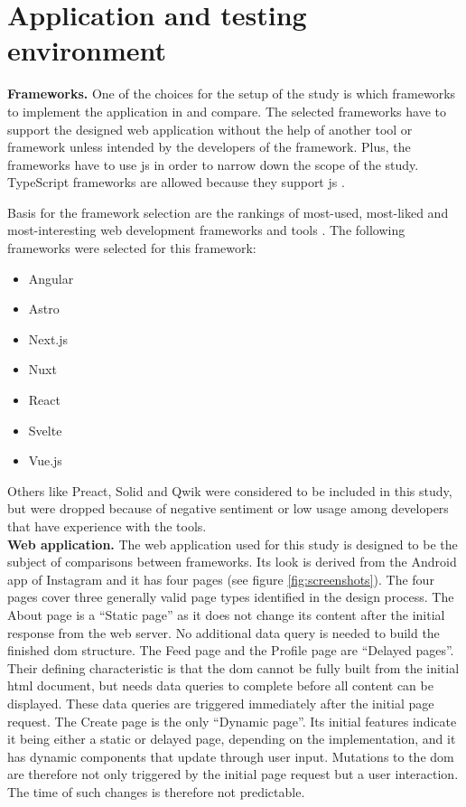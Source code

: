 \documentclass[a4paper, 12pt]{article}
\begin{document}
\section{Application and testing environment}

\textbf{Frameworks.} One of the choices for the setup of the study is which frameworks to implement the application in and compare.
The selected frameworks have to support the designed web application without the help of another tool or framework unless intended by the developers of the framework.
Plus, the frameworks have to use \acrfull{js}  in order to narrow down the scope of the study.
TypeScript frameworks are allowed because they support \acrshort{js} \citep{typescript}.

Basis for the framework selection are the rankings of most-used, most-liked and most-interesting web development frameworks and tools \citep{stateOfJs2023}.
The following frameworks were selected for this framework:

\begin{multicols}{4}
\begin{itemize}
  \item Angular
  \item Astro
  \item Next.js
  \item Nuxt
  \item React
  \item Svelte
  \item Vue.js
\end{itemize}
\end{multicols}

Others like Preact, Solid and Qwik were considered to be included in this study, but were dropped because of negative sentiment or low usage among developers that have experience with the tools.
\\

\textbf{Web application.} The web application used for this study is designed to be the subject of comparisons between frameworks.
Its look is derived from the Android app of Instagram \citep{instagram} and it has four pages (see figure \ref{fig:screenshots}).
The four pages cover three generally valid page types identified in the design process.
The About page is a \enquote{Static page} as it does not change its content after the initial response from the web server.
No additional data query is needed to build the finished \acrshort{dom} structure.
The Feed page and the Profile page are \enquote{Delayed pages}.
Their defining characteristic is that the \acrshort{dom} cannot be fully built from the initial \acrshort{html} document, but needs data queries to complete before all content can be displayed.
These data queries are triggered immediately after the initial page request.
The Create page is the only \enquote{Dynamic page}.
Its initial features indicate it being either a static or delayed page, depending on the implementation, and it has dynamic components that update through user input.
Mutations to the \acrshort{dom} are therefore not only triggered by the initial page request but a user interaction.
The time of such changes is therefore not predictable.
\end{document}
